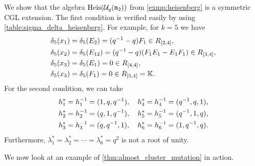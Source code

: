 \begin{example}

	We show that the algebra $\operatorname{Heis}(\mathcal{U}_q(\mathfrak{n}_2))$ from \cref{exmp:heisenberg} is a
	symmetric CGL extension. The first condition is verified easily by using
	\cref{table:sigma_delta_heisenberg}. For example, for $k = 5$ we have
	\begin{align*}
		 & \delta_5(x_1) = \delta_5(E_2) = (q^{-1} - q)F_1 \in R_{[2,4]},                   \\
		 & \delta_5(x_2) = \delta_5(E_{12}) = (q^{-1} - q)(F_1E_1 - E_1 F_1) \in R_{[3,4]}, \\
		 & \delta_5(x_3) = \delta_5(E_{1}) = 0 \in R_{[4,4]},                              \\
		 & \delta_5(x_3) = \delta_5(F_{1}) = 0 \in R_{[5,4]} = \mathbb{K}.
	\end{align*}
	For the second condition, we can take
	\begin{align*}
		h_1^* & = h_1^{-1} =(1, q, q^{-1}), \quad h_4^* = h_4^{-1} = (q^{-1}, q, 1), \\
		h_2^* & = h_2^{-1} =(q, 1, q^{-1}), \quad h_5^* = h_5^{-1} = (q^{-1},1, q),  \\
		h_3^* & = h_3^{-1} =(q, q^{-1}, 1), \quad h_6^* = h_6^{-1} = (1, q^{-1}, q).
	\end{align*}
	Furthermore, $\lambda_1^* = \lambda_2^* = \cdots = \lambda_6^* = q^2$ is not a root of
	unity.
\end{example}

We now look at an example of \cref{thm:almost_cluster_mutation} in action.

